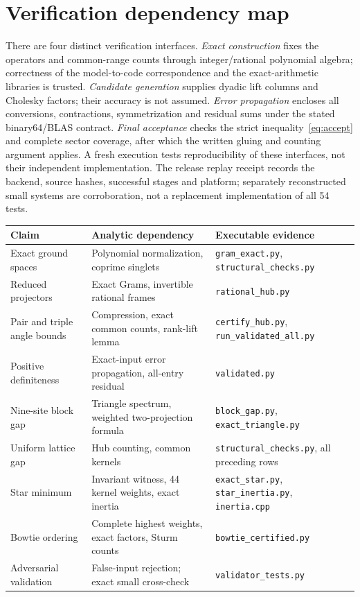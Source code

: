 \documentclass[11pt,a4paper]{article}
\theoremstyle{remark}\newtheorem{remark}[theorem]{Remark}
\begin{document}
\section{Verification dependency map}
There are four distinct verification interfaces. \emph{Exact construction} fixes the operators and common-range counts through integer/rational polynomial algebra; correctness of the model-to-code correspondence and the exact-arithmetic libraries is trusted. \emph{Candidate generation} supplies dyadic lift columns and Cholesky factors; their accuracy is not assumed. \emph{Error propagation} encloses all conversions, contractions, symmetrization and residual sums under the stated binary64/BLAS contract. \emph{Final acceptance} checks the strict inequality~\eqref{eq:accept} and complete sector coverage, after which the written gluing and counting argument applies. A fresh execution tests reproducibility of these interfaces, not their independent implementation. The release replay receipt records the backend, source hashes, successful stages and platform; separately reconstructed small systems are corroboration, not a replacement implementation of all 54 tests.
\begin{center}\small
\begin{tabular}{p{}p{}p{}}\toprule
Claim&Analytic dependency&Executable evidence\\\midrule
Exact ground spaces&Polynomial normalization, coprime singlets&\texttt{gram\_exact.py}, \texttt{structural\_checks.py}\\
Reduced projectors&Exact Grams, invertible rational frames&\texttt{rational\_hub.py}\\
Pair and triple angle bounds&Compression, exact common counts, rank-lift lemma&\texttt{certify\_hub.py}, \texttt{run\_validated\_all.py}\\
Positive definiteness&Exact-input error propagation, all-entry residual&\texttt{validated.py}\\
Nine-site block gap&Triangle spectrum, weighted two-projection formula&\texttt{block\_gap.py}, \texttt{exact\_triangle.py}\\
Uniform lattice gap&Hub counting, common kernels&\texttt{structural\_checks.py}, all preceding rows\\
Star minimum&Invariant witness, 44 kernel weights, exact inertia&\texttt{exact\_star.py}, \texttt{star\_inertia.py}, \texttt{inertia.cpp}\\
Bowtie ordering&Complete highest weights, exact factors, Sturm counts&\texttt{bowtie\_certified.py}\\
Adversarial validation&False-input rejection; exact small cross-check&\texttt{validator\_tests.py}\\\bottomrule
\end{tabular}
\end{center}
\end{document}
